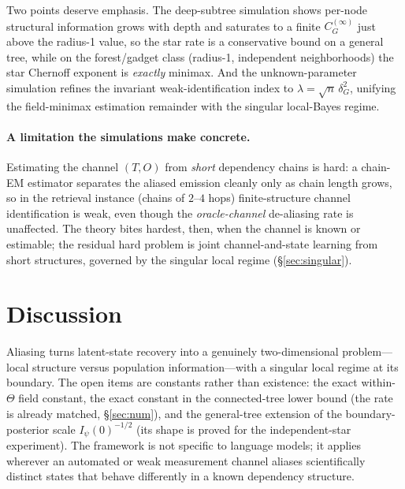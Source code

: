 \documentclass[11pt]{article}
\theoremstyle{plain}
\theoremstyle{definition}\newtheorem{definition}{Definition}\newtheorem{assumption}{Assumption}
\begin{document}
Two points deserve emphasis. The deep-subtree simulation shows per-node structural information grows with depth and
saturates to a finite $C_G^{(\infty)}$ just above the radius-1 value, so the star rate is a conservative bound on a
general tree, while on the forest/gadget class (radius-1, independent neighborhoods) the star Chernoff exponent is
\emph{exactly} minimax. And the unknown-parameter simulation refines the invariant weak-identification index to
$\lambda=\sqrt n\,\delta_G^2$, unifying the field-minimax estimation remainder with the singular local-Bayes regime.

\paragraph{A limitation the simulations make concrete.} Estimating the channel $(T,O)$ from \emph{short} dependency
chains is hard: a chain-EM estimator separates the aliased emission cleanly only as chain length grows, so in the
retrieval instance (chains of $2$--$4$ hops) finite-structure channel identification is weak, even though the
\emph{oracle-channel} de-aliasing rate is unaffected. The theory bites hardest, then, when the channel is known or
estimable; the residual hard problem is joint channel-and-state learning from short structures, governed by the
singular local regime (\S\ref{sec:singular}).

\section{Discussion}
Aliasing turns latent-state recovery into a genuinely two-dimensional problem---local structure versus population
information---with a singular local regime at its boundary. The open items are constants rather than existence:
the exact within-$\Theta$ field constant, the exact constant in the connected-tree lower bound (the rate is
already matched, \S\ref{sec:num}), and the general-tree extension of the boundary-posterior scale
$I_\psi(0)^{-1/2}$ (its shape is proved for the independent-star experiment). The framework is not specific to
language models; it applies wherever an automated or weak measurement channel aliases scientifically distinct
states that behave differently in a known dependency structure.

\appendix
\end{document}

